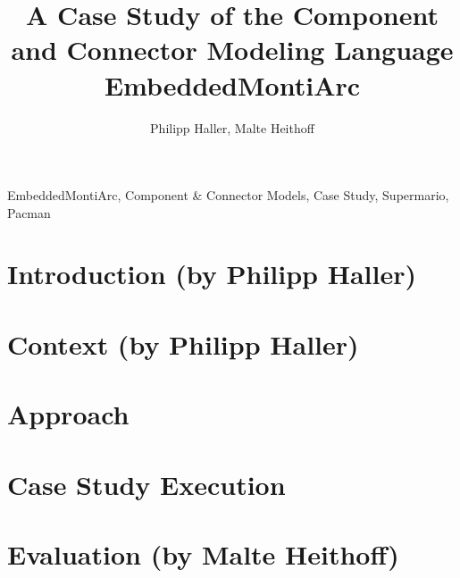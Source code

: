 \documentclass{elsarticle}
\begin{document}
\begin{frontmatter}

\title{A Case Study of the Component and Connector Modeling Language EmbeddedMontiArc}
\tnotetext[mytitlenote]{}

\author{Philipp Haller, Malte Heithoff}
\address{Supervised by: Michael von Wenckstern and Bernhard Rumpe \\ Software Engineering, RWTH Aachen University}



\begin{abstract}

\end{abstract}

\begin{keyword}
EmbeddedMontiArc, Component \& Connector Models, Case Study, Supermario, Pacman
\end{keyword}

\end{frontmatter}

\linenumbers


\newpage
\section{Introduction (by Philipp Haller)}
\label{sec:intro}



\section{Context (by Philipp Haller)}
\label{sec:context}



\section{Approach}
\label{sec:approach}



\section{Case Study Execution}
\label{sec:implementation}



\section{Evaluation (by Malte Heithoff)}
\label{sec:evaluation}

\end{document}
